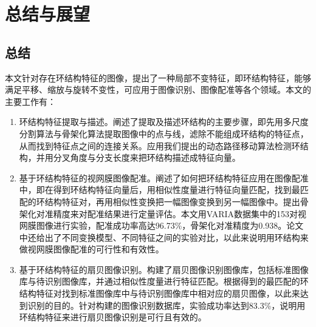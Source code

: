 

\chapter{总结与展望}
\label{cha:intro}

\section{总结}
\label{}
本文针对存在环结构特征的图像，提出了一种局部不变特征，即环结构特征，能够满足平移、缩放与旋转不变性，可应用于图像识别、图像配准等各个领域。本文的主要工作有：
\begin{enumerate}
\item 环结构特征提取与描述。阐述了提取及描述环结构的主要步骤，即先用多尺度分割算法与骨架化算法提取图像中的点与线，滤除不能组成环结构的特征点，从而找到特征点之间的连接关系。应用我们提出的动态路径移动算法检测环结构，并用分叉角度与分支长度来把环结构描述成特征向量。

\item 基于环结构特征的视网膜图像配准。阐述了如何把环结构特征应用在图像配准中，即在得到环结构特征向量后，用相似性度量进行特征向量匹配，找到最匹配的环结构特征对，再用相似性变换把一幅图像变换到另一幅图像中。提出骨架化对准精度来对配准结果进行定量评估。本文用VARIA数据集中的153对视网膜图像进行实验，配准成功率高达96.73\%，骨架化对准精度为0.938。论文中还给出了不同变换模型、不同特征之间的实验对比，以此来说明用环结构来做视网膜图像配准的可行性和有效性。

\item 基于环结构特征的扇贝图像识别。构建了扇贝图像识别图像库，包括标准图像库与待识别图像库，并通过相似性度量进行特征匹配。根据得到的最匹配的环结构特征对找到标准图像库中与待识别图像库中相对应的扇贝图像，以此来达到识别的目的。针对构建的图像识别数据库，实验成功率达到83.3\%，说明用环结构特征来进行扇贝图像识别是可行且有效的。
\end{enumerate}
